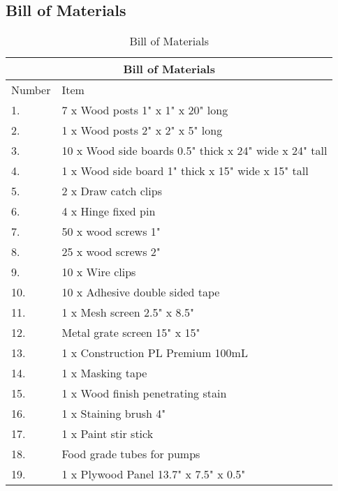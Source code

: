 \documentclass[12pt, titlepage]{article}
\begin{document}
\subsection{Bill of Materials}
\begin{table}[H]
    \begin{tabular}{|p{3cm}|p{10cm}|}
       \hline
        \multicolumn{2}{|c|}{Bill of Materials} \\
        \hline
        Number & Item \\ [0.5ex] 
        \hline\hline
        1. & 7 x Wood posts 1" x 1" x 20" long \\
        \hline
        2. & 1 x Wood posts 2" x 2" x 5" long \\
        \hline
        3. & 10 x Wood side boards 0.5" thick x 24" wide x 24" tall \\
        \hline        
        4. & 1 x Wood side board 1" thick x 15" wide x 15" tall \\
        \hline        
        5. & 2 x Draw catch clips \\
        \hline 
        6. & 4 x Hinge fixed pin \\
        \hline        
        7. & 50 x wood screws 1" \\
        \hline        
        8. & 25 x wood screws 2" \\
        \hline
        9. & 10 x Wire clips \\
        \hline
        10. & 10 x Adhesive double sided tape \\
        \hline        
        11. & 1 x Mesh screen 2.5" x 8.5" \\
        \hline        
        12. & Metal grate screen 15" x 15" \\
        \hline
        13. & 1 x Construction PL Premium 100mL\\
        \hline        
        14. & 1 x Masking tape\\
        \hline        
        15. & 1 x Wood finish penetrating stain \\
        \hline        
        16. & 1 x Staining brush 4" \\
        \hline
        17. & 1 x Paint stir stick\\
        \hline
        18. & Food grade tubes for pumps\\
        \hline
        19. & 1 x Plywood Panel 13.7" x 7.5" x 0.5"
        \hline
    \end{tabular}
    \caption{Bill of Materials}
    \label{tab: caption}
\end{table}
\end{document}
